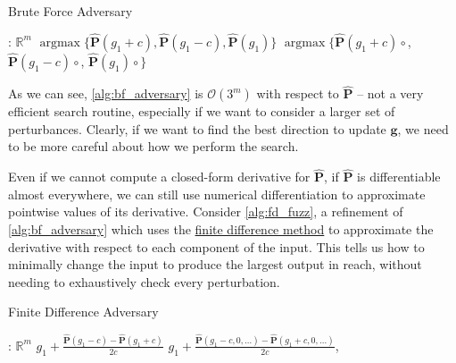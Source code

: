 \begin{algorithm}[H]
\caption{Brute Force Adversary}
\label{alg:bf_adversary}
\begin{algorithmic}[1]
: $\mathbb{R}^m$
 
\State \Return $\operatorname{argmax}\{\mathbf{\hat P}(g_1 + c), \mathbf{\hat P}(g_1 - c), \mathbf{\hat P}(g_1)\}$
\Else {}
\State \Return $\operatorname{argmax}\{\mathbf{\hat P}(g_1 + c) \circ$,\newline
\hspace*{10em} $\mathbf{\hat P}(g_1 - c)\circ$,\newline
\hspace*{10em} $\mathbf{\hat P}(g_1)\circ$$\}$
\EndIf
\EndProcedure
\end{algorithmic}
\end{algorithm}

As we can see, \autoref{alg:bf_adversary} is $\mathcal{O}(3^m)$ with respect to $\mathbf{\hat P}$ -- not a very efficient search routine, especially if we want to consider a larger set of perturbances. Clearly, if we want to find the best direction to update $\mathbf g$, we need to be more careful about how we perform the search.

Even if we cannot compute a closed-form derivative for $\mathbf{\hat P}$, if $\mathbf{\hat P}$ is differentiable almost everywhere, we can still use numerical differentiation to approximate pointwise values of its derivative. Consider \autoref{alg:fd_fuzz}, a refinement of \autoref{alg:bf_adversary} which uses the \hyperref[sec:fdm]{finite difference method} to approximate the derivative with respect to each component of the input. This tells us how to minimally change the input to produce the largest output in reach, without needing to exhaustively check every perturbation.

\begin{algorithm}[H]
\caption{Finite Difference Adversary}
\label{alg:fd_fuzz}
\begin{algorithmic}[1]
: $\mathbb{R}^m$
 
\State \Return $g_1 + \frac{\mathbf{\hat P}(g_1 - c) - \mathbf{\hat P}(g_1 + c)}{2c}$
\Else {}
\State \Return $g_1 + \frac{\mathbf{\hat P}(g_1 - c, 0, \ldots) - \mathbf{\hat P}(g_1 + c, 0, \ldots)}{2c}$, 
\EndIf
\EndProcedure
\end{algorithmic}
\end{algorithm}

